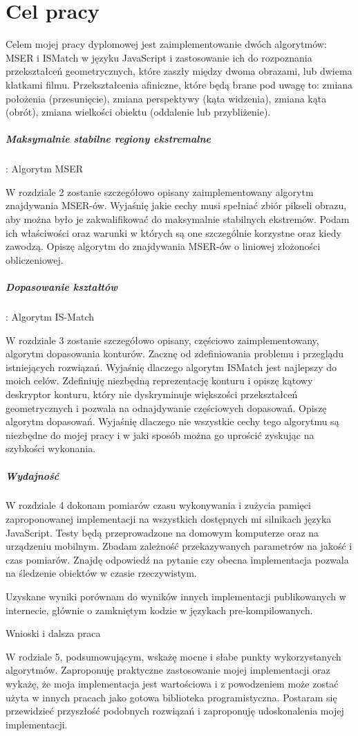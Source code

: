 \section{Cel pracy}

Celem mojej pracy dyplomowej jest zaimplementowanie dwóch algorytmów: MSER i
ISMatch w języku JavaScript i zastosowanie ich do rozpoznania przekształceń
geometrycznych, które zaszły między dwoma obrazami, lub dwiema klatkami filmu.
Przekształcenia afiniczne, które będą brane pod uwagę to: zmiana położenia
(przesunięcie), zmiana perspektywy (kąta widzenia), zmiana kąta (obrót), zmiana
wielkości obiektu (oddalenie lub przybliżenie).

\subparagraph{Maksymalnie stabilne regiony ekstremalne}: Algorytm MSER

W rozdziale 2 zostanie szczegółowo opisany zaimplementowany algorytm
znajdywania MSER-ów. Wyjaśnię jakie cechy musi spełniać zbiór pikseli obrazu,
aby można było je zakwalifikować do maksymalnie stabilnych ekstremów.  Podam
ich właściwości oraz warunki w których są one szczególnie korzystne oraz kiedy
zawodzą. Opiszę algorytm do znajdywania MSER-ów o liniowej złożoności
obliczeniowej.

\subparagraph{Dopasowanie kształtów}: Algorytm IS-Match

W rozdziale 3 zostanie szczegółowo opisany, częściowo zaimplementowany,
algorytm dopasowania konturów. Zacznę od zdefiniowania problemu i przeglądu
istniejących rozwiązań. Wyjaśnię dlaczego algorytm ISMatch jest najlepszy do
moich celów. Zdefiniuję niezbędną reprezentację konturu i opiszę kątowy
deskryptor konturu, który nie dyskryminuje większości przekształceń
geometrycznych i pozwala na odnajdywanie częściowych dopasowań. Opiszę algorytm
dopasowań.  Wyjaśnię dlaczego nie wszystkie cechy tego algorytmu są niezbędne do
mojej pracy i w jaki sposób można go uprościć zyskując na szybkości wykonania.

\subparagraph{Wydajność}

W rozdziale 4 dokonam pomiarów czasu wykonywania i zużycia pamięci
zaproponowanej implementacji na wszystkich dostępnych mi silnikach języka
JavaScript. Testy będą przeprowadzone na domowym komputerze oraz na urządzeniu
mobilnym.  Zbadam zależność przekazywanych parametrów na jakość i czas
pomiarów. Znajdę odpowiedź na pytanie czy obecna implementacja pozwala na
śledzenie obiektów w czasie rzeczywistym.

Uzyskane wyniki porównam do wyników innych implementacji publikowanych w
internecie, głównie o zamkniętym kodzie w językach pre-kompilowanych.

Wnioski i dalsza praca

W rodziale 5, podsumowującym, wskażę mocne i słabe punkty wykorzystanych
algorytmów. Zaproponuję praktyczne zastosowanie mojej implementacji oraz
wykażę, że moja implementacja jest wartościowa i z powodzeniem może zostać
użyta w innych pracach jako gotowa biblioteka programistyczna. Postaram się
przewidzieć przyszłość podobnych rozwiązań i zaproponuję udoskonalenia mojej
implementacji.
